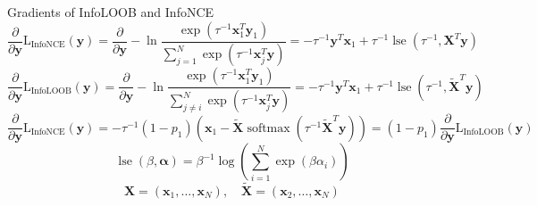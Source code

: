 \documentclass[utf8,aspectratio=169,ngerman,english,usenames,dvipsnames]{beamer}
\begin{document}
\begin{frame}{Gradients of InfoLOOB and InfoNCE}
    \footnotesize
    \begin{equation*}
        \frac{\partial}{\partial \mathbf{y}} \operatorname{L_{InfoNCE}}(\mathbf{y})
        = \frac{\partial}{\partial \mathbf{y}} - \ln \frac{\exp(\tau^{-1} \mathbf{x}_1^T \mathbf{y}_1)}{\textstyle\sum_{j=1}^{N} \exp(\tau^{-1} \mathbf{x}_j^T \mathbf{y})}
        = - \tau^{-1} \mathbf{y}^T \mathbf{x}_1 + \tau^{-1} \operatorname{lse}(\tau^{-1}, \mathbf{X}^T \mathbf{y})
    \end{equation*}
    \begin{equation*}
        \frac{\partial}{\partial \mathbf{y}} \operatorname{L_{InfoLOOB}}(\mathbf{y})
        = \frac{\partial}{\partial \mathbf{y}} - \ln \frac{\exp(\tau^{-1} \mathbf{x}_1^T \mathbf{y}_1)}{\textstyle\sum_{j \neq i}^{N} \exp(\tau^{-1} \mathbf{x}_j^T \mathbf{y})}
        = - \tau^{-1} \mathbf{y}^T \mathbf{x}_1 + \tau^{-1} \operatorname{lse}(\tau^{-1}, \tilde{\mathbf{X}}^T \mathbf{y})
    \end{equation*}
    \begin{equation*}
        \frac{\partial}{\partial \mathbf{y}} \operatorname{L_{InfoNCE}}(\mathbf{y})
        = - \tau^{-1} (1 - p_1) (\mathbf{x}_1 - \tilde{\mathbf{X}} \operatorname{softmax}(\tau^{-1} \tilde{\mathbf{X}}^T \mathbf{y}))
        = (1-p_1) \frac{\partial}{\partial \mathbf{y}} \operatorname{L_{InfoLOOB}}(\mathbf{y})
    \end{equation*}
    \begin{equation*}
        \operatorname{lse}(\beta, \boldsymbol{\alpha}) = \beta^{-1} \log \left( \sum_{i=1}^{N}\exp(\beta \alpha_i) \right)
    \end{equation*}
    \begin{equation*}
        \mathbf{X} = (\mathbf{x}_1, \dots, \mathbf{x}_N), \quad \tilde{\mathbf{X}} = (\mathbf{x}_2, \dots, \mathbf{x}_N)
    \end{equation*}
\end{frame}
\end{document}
